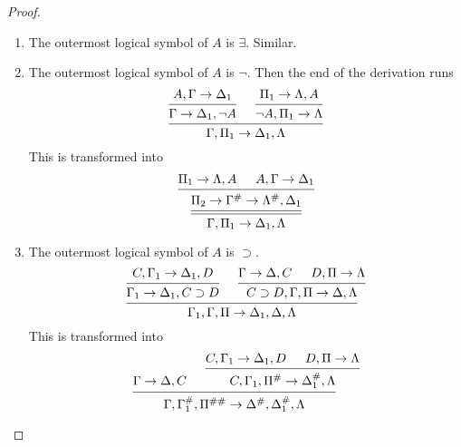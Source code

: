 \documentclass[11pt]{article}
\begin{document}
\begin{proof}
\begin{enumerate}
\begin{enumerate}
\begin{enumerate}
(\(a\) being fully indicated in \(F(a)\)). By the eigenvariable
condition, \(a\) does not occur in \(\Gamma,\Delta_1\) or \(F(x)\). Since
by assumption the proof ending with \(\Gamma\to\Delta_1, F(a)\)
contains no mix, we can obtain a proof without a mix, ending with
\(\Gamma\to\Delta_1,F(t)\). Consider 
\begin{equation*}
\begin{prooftree}%
\hypo{\Gamma\to\Delta_1,F(t)}
\hypo{F(t),\Pi_1\to\Lambda}
\infer2[\((F(t))\)]{\Gamma,\Pi_1^\#\to\Delta_1^\#,\Lambda}
\end{prooftree}
\end{equation*}
\item The outermost logical symbol of \(A\) is \(\exists\). Similar.
\item The outermost logical symbol of \(A\) is \(\neg\).
Then the end of the derivation runs
\begin{equation*}
\begin{prooftree}%
\hypo{A,\Gamma\to\Delta_1}
\infer1{\Gamma\to\Delta_1,\neg A}
\hypo{\Pi_1\to\Lambda,A}
\infer1{\neg A,\Pi_1\to\Lambda}
\infer2{\Gamma,\Pi_1\to\Delta_1,\Lambda}
\end{prooftree}
\end{equation*}
This is transformed into
\begin{equation*}
\begin{prooftree}%
\hypo{\Pi_1\to\Lambda,A}
\hypo{A,\Gamma \to\Delta_1}
\infer2{\Pi_2\to\Gamma^\#\to\Lambda^\#,\Delta_1}
\infer[double]1{\Gamma,\Pi_1\to\Delta_1,\Lambda}
\end{prooftree}
\end{equation*}
\item The outermost logical symbol of \(A\) is \(\supset\).
\begin{equation*}
\begin{prooftree}%
\hypo{C,\Gamma_1\to\Delta_1,D}
\infer1{\Gamma_1\to\Delta_1,C\supset D}
\hypo{\Gamma\to\Delta,C}
\hypo{D,\Pi\to\Lambda}
\infer2{C\supset D,\Gamma,\Pi\to\Delta,\Lambda}
\infer2{\Gamma_1,\Gamma,\Pi \to\Delta_1,\Delta,\Lambda}
\end{prooftree}
\end{equation*}
This is transformed into
\begin{equation*}
\begin{prooftree}%
\hypo{\Gamma\to\Delta,C}
\hypo{C,\Gamma_1\to\Delta_1,D}
\hypo{D,\Pi\to\Lambda}
\infer2{C,\Gamma_1,\Pi^\#\to\Delta_1^\#,\Lambda}
\infer2{\Gamma,\Gamma_1^\#,\Pi^{\#\#}\to\Delta^\#,\Delta_1^\#,\Lambda}

\end{prooftree}
\end{equation*}
\end{enumerate}
\end{enumerate}
\end{enumerate}
\end{proof}
\end{document}
